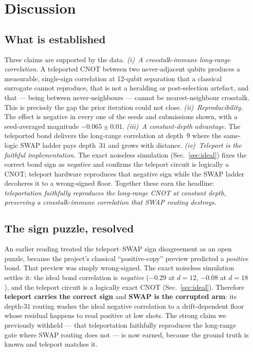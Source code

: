 \documentclass[conference]{IEEEtran}
\begin{document}
\section{Discussion}

\subsection{What is established}

Three claims are supported by the data. \emph{(i)~A crosstalk-immune long-range
correlation.} A teleported CNOT between two never-adjacent qubits produces a measurable,
single-sign correlation at 12-qubit separation that a classical surrogate cannot reproduce,
that is not a heralding or post-selection artefact, and that --- being between
never-neighbours --- cannot be nearest-neighbour crosstalk. This is precisely the gap the
prior iteration could not close. \emph{(ii)~Reproducibility.} The effect is negative in
every one of the seeds and submissions shown, with a seed-averaged magnitude
$-0.065\pm0.01$. \emph{(iii)~A constant-depth advantage.} The teleported bond delivers the
long-range correlation at depth~$9$ where the same-logic SWAP ladder pays depth~$31$ and
grows with distance. \emph{(iv)~Teleport is the faithful implementation.} The exact
noiseless simulation (Sec.~\ref{sec:ideal}) fixes the correct bond sign as \emph{negative}
and confirms the teleport circuit is logically a CNOT; teleport hardware reproduces that
negative sign while the SWAP ladder decoheres it to a wrong-signed floor. Together these
earn the headline: \emph{teleportation faithfully reproduces the long-range CNOT at
constant depth, preserving a crosstalk-immune correlation that SWAP routing destroys.}

\subsection{The sign puzzle, resolved}

An earlier reading treated the teleport--SWAP sign disagreement as an open puzzle, because
the project's classical ``positive-copy'' preview predicted a \emph{positive} bond. That
preview was simply wrong-signed. The exact noiseless simulation settles it: the ideal bond
correlation is \emph{negative} ($-0.29$ at $d{=}12$, $-0.08$ at $d{=}18$), and the teleport
circuit is a logically exact CNOT (Sec.~\ref{sec:ideal}). Therefore \textbf{teleport
carries the correct sign} and \textbf{SWAP is the corrupted arm}: its depth-$31$ routing
washes the ideal negative correlation to a drift-dependent floor whose residual happens to
read positive at low shots. The strong claim we previously withheld --- that teleportation
faithfully reproduces the long-range gate where SWAP routing does not --- is now earned,
because the ground truth is known and teleport matches it.
\end{document}
